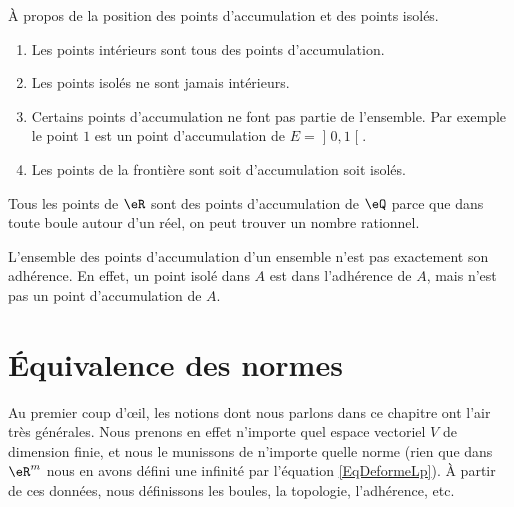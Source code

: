 \begin{remark}
    À propos de la position des points d'accumulation et des points isolés.
    \begin{enumerate}
        \item
            Les points intérieurs sont tous des points d'accumulation.
        \item
            Les points isolés ne sont jamais intérieurs.
        \item
            Certains points d'accumulation ne font pas partie de l'ensemble. Par exemple le point $1$ est un point d'accumulation de $E=\mathopen] 0 , 1 \mathclose[$.
        \item
            Les points de la frontière sont soit d'accumulation soit isolés.
    \end{enumerate}
\end{remark}


\begin{example}
	Tous les points de $\eR$ sont des points d'accumulation de $\eQ$ parce que dans toute boule autour d'un réel, on peut trouver un nombre rationnel.
\end{example}

\begin{remark}
	L'ensemble des points d'accumulation d'un ensemble n'est pas exactement son adhérence. En effet, un point isolé dans $A$ est dans l'adhérence de $A$, mais n'est pas un point d'accumulation de $A$.
\end{remark}

\section{Équivalence des normes}
\label{normes_equiv}

Au premier coup d'œil, les notions dont nous parlons dans ce chapitre ont l'air très générales. Nous prenons en effet n'importe quel espace vectoriel $V$ de dimension finie, et nous le munissons de n'importe quelle norme (rien que dans $\eR^m$ nous en avons défini une infinité par l'équation \eqref{EqDeformeLp}). À partir de ces données, nous définissons les boules, la topologie, l'adhérence, etc.


